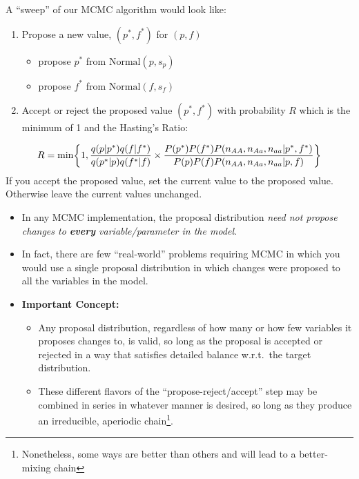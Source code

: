 A ``sweep'' of our MCMC algorithm would look like:
\begin{enumerate}
\item Propose a new value, $(p^*,f^*)$ for $(p,f)$
\begin{itemize}
\item propose $p^*$ from $\mathrm{Normal}(p,s_p)$
\item propose $f^*$ from $\mathrm{Normal}(f,s_f)$
\end{itemize}
\item Accept or reject the proposed value $(p^*,f^*)$ with probability $R$ which is the minimum of 1 and the Hasting's Ratio:
\end{enumerate}
\[
\small
R=\min\biggr\{1,
\frac{q(p|p^*)q(f|f^*)}{q(p^*|p)q(f^*|f) } \times 
\frac{P(p^*)P(f^*)P(n_{AA},n_{Aa},n_{aa}|p^*,f^*)}{P(p)P(f)P(n_{AA},n_{Aa},n_{aa}|p,f)}
\biggl\}
\]
If you accept the proposed value, set the current value to the proposed value.  Otherwise leave the current values unchanged.



\begin{itemize}
\item In any MCMC implementation, the proposal distribution {\em need not propose changes to {\bf every} variable/parameter  in the model}.
\item In fact, there are few ``real-world'' problems requiring MCMC in which you would use a single proposal distribution in which changes were proposed to all the variables in the model.
\item {\bf Important Concept:}
\begin{itemize}
\item Any proposal distribution, regardless of how many or how few variables it proposes changes to, is valid, so long as the proposal is accepted or rejected in a way that satisfies detailed balance w.r.t.\ the target distribution.
\item These different flavors of the ``propose-reject/accept'' step may be combined in series in whatever manner is desired, so long as they produce an irreducible, aperiodic chain\footnote{Nonetheless, some ways are better than others and will lead to a better-mixing chain}. 
\end{itemize}
\end{itemize}


